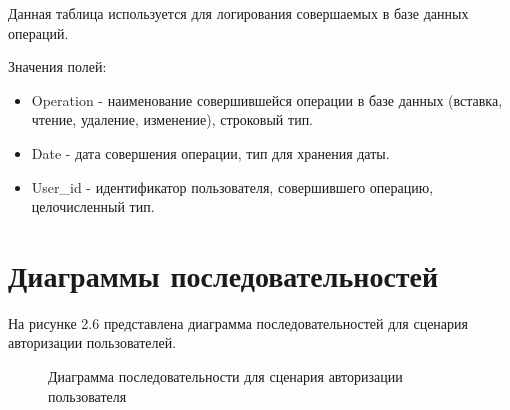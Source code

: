 Данная таблица используется для логирования совершаемых в базе данных операций.

Значения полей:

\begin{itemize}
	\item Operation - наименование совершившейся операции в базе данных (вставка, чтение, удаление, изменение), строковый тип.
	\item Date - дата совершения операции, тип для хранения даты.
	\item User\_id - идентификатор пользователя, совершившего операцию, целочисленный тип.
\end{itemize}

\clearpage

\section{Диаграммы последовательностей}

На рисунке 2.6 представлена диаграмма последовательностей для сценария авторизации пользователей.

\begin{figure}[!h]
	\caption{Диаграмма последовательности для сценария авторизации пользователя}
\end{figure}

